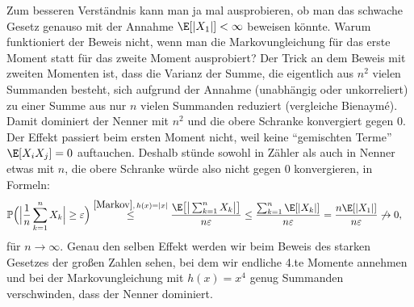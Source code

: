 	Zum besseren Verst\"andnis kann man ja mal ausprobieren, ob man das schwache Gesetz genauso mit der Annahme $\E[|X_1|]<\infty$ beweisen k\"onnte. Warum funktioniert der Beweis nicht, wenn man die Markovungleichung f\"ur das erste Moment statt f\"ur das zweite Moment ausprobiert? Der Trick an dem Beweis mit zweiten Momenten ist, dass die Varianz der Summe, die eigentlich aus $n^2$ vielen Summanden besteht, sich aufgrund der Annahme (unabh\"angig oder unkorreliert) zu einer Summe aus nur $n$ vielen Summanden reduziert (vergleiche Bienaym\'e). Damit dominiert der Nenner mit $n^2$ und die obere Schranke konvergiert gegen $0$. Der Effekt passiert beim ersten Moment nicht, weil keine \enquote{gemischten Terme} $\E[X_iX_j]=0$ auftauchen. Deshalb st\"unde sowohl in Z\"ahler als auch in Nenner etwas mit $n$, die obere Schranke w\"urde also nicht gegen $0$ konvergieren, in Formeln:
	\begin{align*}
		\mathbb{P}\Big(\Big|\frac{1}{n} \sum\limits_{k=1}^{n} X_k\Big| \geq \varepsilon\Big)
		&\overset{\ref{Markov},\, h(x)=|x|}{\leq} \frac{\E \big[\big|\sum_{k=1}^n X_k\big|\big] }{n\varepsilon}\leq \frac{\sum_{k=1}^n \E[|X_k|]}{n\varepsilon}= \frac{n\E[|X_1|]}{n\varepsilon} \not\to 0,
	\end{align*}
	f\"ur $n\to\infty$. Genau den selben Effekt werden wir beim Beweis des starken Gesetzes der gro\ss en Zahlen sehen, bei dem wir endliche 4.te Momente annehmen und bei der Markovungleichung mit $h(x)=x^4$ genug Summanden verschwinden, dass der Nenner dominiert.
	
	


